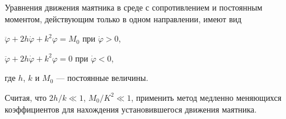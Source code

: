 Уравнения движения маятника в среде с сопротивлением и постоянным моментом,
действующим только в одном направлении, имеют вид
\begin{description}
\item $\ddot{\varphi} + 2h\dot{\varphi} + k^2\varphi = M_0$
при $\dot{\varphi} > 0$,
\item $\ddot{\varphi} + 2h\dot{\varphi} + k^2\varphi = 0$
при $\dot{\varphi} < 0$,
\end{description}
где $h$, $k$ и $M_0$ --- постоянные величины.

Считая, что $2h/k \ll 1$, $M_0 /K^2 \ll 1$,
применить метод медленно меняющихся коэффициентов
для нахождения установившегося движения маятника.
